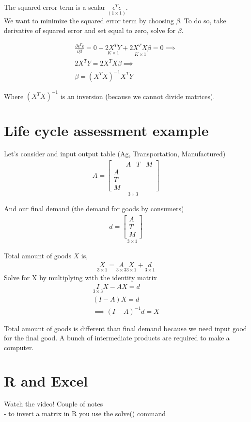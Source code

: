\documentclass{article}
\begin{document}
The squared error term is a scalar $\underset{(1 \times 1)}{\epsilon^T \epsilon}$. \\

We want to minimize the squared error term by choosing $\beta$. To do so, take derivative of squared error and set equal to zero, solve for $\beta$. 

\begin{align}
    \frac{\partial \epsilon^T  \epsilon }{ \partial \beta} = 0 - \underset{K \times 1}{2X^T Y} + \underset{K \times 1}{2 X^T X \beta} = 0 \implies \\
    2X^T Y = 2 X^T X \beta \implies \\
    \beta = {(X^T X)}^{-1} X^T Y
\end{align}

Where ${(X^T X)}^{-1}$ is an inversion (because we cannot divide matrices). 

\section{Life cycle assessment example}

Let's consider and input output table (Ag, Transportation, Manufactured)
\begin{align}
    A = \underset{ 3 \times 3}{\begin{bmatrix}
         & A & T & M \\
         A \\
         T\\
         M
    \end{bmatrix}}
\end{align}

And our final demand (the demand for goods by consumers) 
\begin{align}
    d = \underset{3 \times 1}{\begin{bmatrix}
        A \\
        T\\
        M
    \end{bmatrix}}
\end{align}

Total amount of goods $X$ is, 
\begin{align}
    \underset{3 \times 1}{X} = \underset{3 \times 3}{A} \underset{3 \times 1}{X} + \underset{3 \times 1}{d}
 \end{align}
Solve for X by multiplying with the identity matrix 
\begin{align}
    \underset{3 \times 3}{I} X - AX = d\\
    (I - A) X = d\\
    \implies (I - A)^{-1}d = X
\end{align}

Total amount of goods is different than final demand because we need input good for the final good. A bunch of intermediate products are required to make a computer. 


\section{R and Excel}
Watch the video! Couple of notes \\
- to invert a matrix in R you use the solve() command
\end{document}
